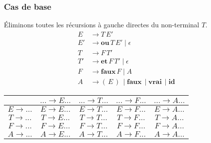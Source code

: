 \documentclass[class=article]{standalone}
\begin{document}
\subsubsection*{Cas de base}
Éliminons toutes les récursions à gauche directes du non-terminal $T$.
\begin{align*}
    E &\rightarrow T \, E'\\
    E'&\rightarrow \textbf{ou} \, T \, E' \mid \epsilon\\
    T &\rightarrow F \, T'\\
    T'&\rightarrow \textbf{et} \, F \, T' \mid \epsilon\\
    F &\rightarrow \textbf{faux} \, F \mid A\\
    A &\rightarrow ( \, E \, ) \, \mid \textbf{faux} \, \mid \textbf{vrai} \, \mid \textbf{id}
\end{align*}
\begin{center}
    \begin{tabular}{c|c|c|c|c|}
        \cellcolor[HTML]{FFFFFF}                     & 
        \cellcolor[HTML]{FFFFFF} $... \rightarrow E...$ &
        \cellcolor[HTML]{FFFFFF} $... \rightarrow T...$ & 
        \cellcolor[HTML]{FFFFFF} $... \rightarrow F...$ & 
        \cellcolor[HTML]{FFFFFF} $... \rightarrow A...$ \\
    \hline
        \cellcolor[HTML]{FFFFFF} $E \rightarrow ...$ & 
        \cellcolor[HTML]{FF0000} $E \rightarrow E...$ & 
        \cellcolor[HTML]{ABFF00} $E \rightarrow T...$ & 
        \cellcolor[HTML]{ABFF00} $E \rightarrow F...$ & 
        \cellcolor[HTML]{ABFF00} $E \rightarrow A...$ \\
    \hline
        \cellcolor[HTML]{FFFFFF} $T \rightarrow ...$ & 
        \cellcolor[HTML]{FF0000} $T \rightarrow E...$ & 
        \cellcolor[HTML]{FF0000} $T \rightarrow T...$ & 
        \cellcolor[HTML]{ABFF00} $T \rightarrow F...$ &
        \cellcolor[HTML]{ABFF00} $T \rightarrow A...$ \\
    \hline
        \cellcolor[HTML]{FFFFFF} $F \rightarrow ...$ &
        \cellcolor[HTML]{FFFFFF} $F \rightarrow E...$ &
        \cellcolor[HTML]{FFFFFF} $F \rightarrow T...$ & 
        \cellcolor[HTML]{FFFFFF} $F \rightarrow F...$ & 
        \cellcolor[HTML]{ABFF00} $F \rightarrow A...$ \\
    \hline
        \cellcolor[HTML]{FFFFFF} $A \rightarrow ...$ & 
        \cellcolor[HTML]{FFFFFF} $A \rightarrow E...$ & 
        \cellcolor[HTML]{FFFFFF} $A \rightarrow T...$ & 
        \cellcolor[HTML]{FFFFFF} $A \rightarrow F...$ & 
        \cellcolor[HTML]{FFFFFF} $A \rightarrow A...$ \\
    \hline
    \end{tabular}
\end{center}
\end{document}
